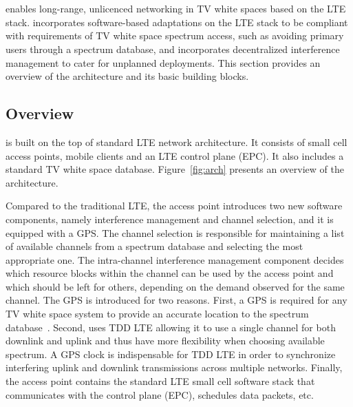 \section{\cf}


\cf enables long-range, unlicenced networking in TV white spaces 
based on the LTE stack. \cf incorporates software-based adaptations on the LTE stack to be compliant with
 requirements of TV white space spectrum access, such as avoiding primary users through a spectrum database, and incorporates decentralized interference management to cater for unplanned deployments. 
This section provides an overview of the \cf architecture and its basic building blocks.



\subsection{Overview}

\cf is built on the top of standard LTE network architecture. It consists of small cell access points, mobile clients and an LTE control plane (EPC). It also includes a standard TV white space database. Figure~\ref{fig:arch} presents an overview of the \cf architecture.

Compared to the traditional LTE, the \cf access point introduces two new software components, namely interference management and channel selection, and it is equipped with a GPS.
The channel selection is responsible for maintaining a list of available channels from a spectrum database and selecting the most appropriate one. 
The intra-channel interference management component decides which resource blocks within the channel can be used by the access point and which should be left for others, 
depending on the demand observed for the same channel. The GPS is introduced for two reasons. First, a GPS is required for any TV white space system to provide an accurate location to the spectrum database~\cite{Rice_af}. 
Second, \cf uses TDD LTE allowing it to use a single channel for both downlink and uplink and thus have more flexibility when choosing available spectrum. A GPS clock is indispensable for TDD LTE in order to synchronize interfering uplink and downlink transmissions across multiple networks. Finally, the access point contains the standard LTE small cell software stack that communicates with the control plane (EPC), 
schedules data packets, etc. 


